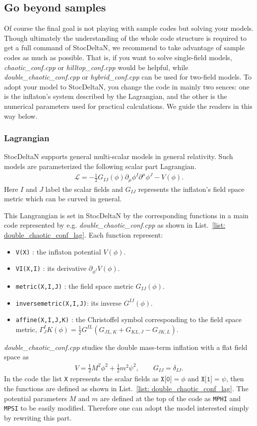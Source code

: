 \documentclass[aps, prd
, preprint
, nofootinbib 
, notitlepage
, superscriptaddress
, longbibliography
]{revtex4-1}
\newcommand{\calL}{\mathcal{L}}
\newcommand{\bae}[1]{\begin{align} #1 \end{align}}
\begin{document}
\subsection{Go beyond samples}

Of course the final goal is not playing with sample codes but solving your models. Though ultimately the understanding of the whole code structure is required
to get a full command of StocDeltaN, we recommend to take advantage of sample codes as much as possible. That is, if you want to solve single-field models,
\textit{chaotic\_conf.cpp} or \textit{hilltop\_conf.cpp} would be helpful, while \textit{double\_chaotic\_conf.cpp} or \textit{hybrid\_conf.cpp} can be used for two-field models.
To adopt your model to StocDeltaN, you change the code in mainly two sences: one is the inflaton's system described by the Lagrangian, and the other is 
the numerical parameters used for practical calculations. We guide the readers in this way below.

\subsubsection{Lagrangian}

StocDeltaN supports general multi-scalar models in general relativity. Such models are parameterized the following scalar part Lagrangian.
\bae{
	\calL=-\frac{1}{2}G_{IJ}(\phi)\partial_\mu\phi^I\partial^\mu\phi^J-V(\phi).
}
Here $I$ and $J$ label the scalar fields and $G_{IJ}$ represents the inflaton's field space metric which can be curved in general.

This Langrangian is set in StocDeltaN by the corresponding functions in a main code represented by e.g. \textit{double\_chaotic\_conf.cpp}
as shown in List.~\ref{list: double_chaotic_conf_lag}.
Each function represent:
\begin{itemize}
\item \texttt{V(X)} : the inflaton potential $V(\phi)$.
\item \texttt{VI(X,I)} : its derivative $\partial_{\phi^I}V(\phi)$.
\item \texttt{metric(X,I,J)} : the field space metric $G_{IJ}(\phi)$.
\item \texttt{inversemetric(X,I,J)}: its inverse $G^{IJ}(\phi)$.
\item \texttt{affine(X,I,J,K)} : the Christoffel symbol corresponding to the field space metric, $\Gamma^I_JK(\phi)=\frac{1}{2}G^{IL}(G_{JL,K}+G_{KL,J}-G_{JK,L})$.
\end{itemize}
\textit{double\_chaotic\_conf.cpp} studies the double mass-term inflation with a flat field space as
\bae{
	V=\frac{1}{2}M^2\phi^2+\frac{1}{2}m^2\psi^2, \qquad G_{IJ}=\delta_{IJ}.
}
In the code the list \texttt{X} represents the scalar fields as $\texttt{X[0]}=\phi$ and $\texttt{X[1]}=\psi$, then the functions are defined as shown 
in List.~\ref{list: double_chaotic_conf_lag}. The potential parameters $M$ and $m$ are defined at the top of the code as \texttt{MPHI} and \texttt{MPSI} to be easily modified.
Therefore one can adopt the model interested simply by rewriting this part.
\end{document}
